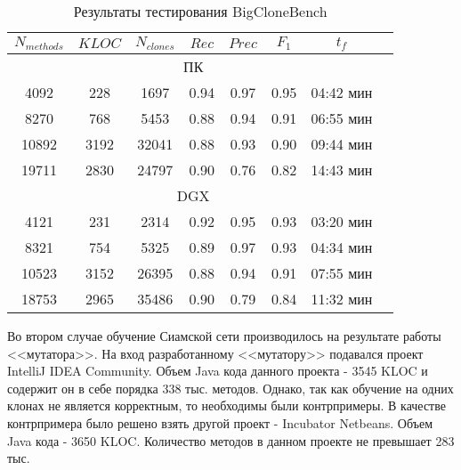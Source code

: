 \begin{table}[H]
\centering
\captionsetup{skip=5pt}
\caption{Результаты тестирования BigCloneBench}
\label{testing}
\begin{tabular}{|c|c|c|c|c|c|c|c|}
\hline
\(N_{methods}\) & \(KLOC\) & \(N_{clones}\) & \(Rec\)  & \(Prec\) & \(F_1\) & \(t_f\)        \\ \hline
\multicolumn{7}{|c|}{ПК}										   		    			   \\ \hline
4092			& 228	   & 1697			& 0.94	   & 0.97 	  & 0.95 	& 04:42 мин	   \\ \hline
8270			& 768  	   & 5453    		& 0.88 	   & 0.94 	  & 0.91 	& 06:55 мин	   \\ \hline
10892			& 3192 	   & 32041   		& 0.88 	   & 0.93 	  & 0.90 	& 09:44 мин 	   \\ \hline
19711    		& 2830 	   & 24797   		& 0.90 	   & 0.76 	  & 0.82 	& 14:43 мин 	   \\ \hline
\multicolumn{7}{|c|}{DGX}										   		      		   \\ \hline
4121			& 231	   & 2314    		& 0.92 	   & 0.95 	  & 0.93 	& 03:20 мин 	   \\ \hline
8321     		& 754  	   & 5325    		& 0.89 	   & 0.97 	  & 0.93 	& 04:34 мин 	   \\ \hline
10523    		& 3152 	   & 26395   		& 0.88 	   & 0.94 	  & 0.91 	& 07:55 мин 	   \\ \hline
18753    		& 2965 	   & 35486   		& 0.90 	   & 0.79 	  & 0.84 	& 11:32 мин 	   \\ \hline
\end{tabular}
\end{table}

Во втором случае обучение Сиамской сети производилось на результате работы <<мутатора>>. На вход разработанному <<мутатору>> подавался проект IntelliJ IDEA Community. Объем Java кода данного проекта - 3545 KLOC и содержит он в себе порядка 338 тыс. методов. Однако, так как обучение на одних клонах не является корректным, то необходимы были контрпримеры. В качестве контрпримера было решено взять другой проект - Incubator Netbeans. Объем Java кода - 3650 KLOC. Количество методов в данном проекте не превышает 283 тыс.

